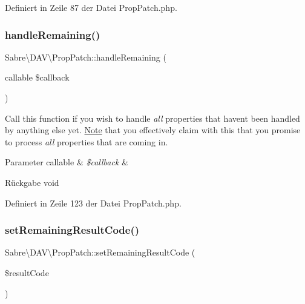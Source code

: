 Definiert in Zeile 87 der Datei Prop\+Patch.\+php.

\mbox{\label{class_sabre_1_1_d_a_v_1_1_prop_patch_a9908d93d975bc2cf4d85e8dbff42cd92}} 
\subsubsection{\texorpdfstring{handle\+Remaining()}{handleRemaining()}}
{\footnotesize\ttfamily Sabre\textbackslash{}\+D\+A\+V\textbackslash{}\+Prop\+Patch\+::handle\+Remaining (\begin{DoxyParamCaption}\item[{callable}]{\$callback }\end{DoxyParamCaption})}

Call this function if you wish to handle {\itshape all} properties that haven\textquotesingle{}t been handled by anything else yet. \mbox{\hyperlink{class_note}{Note}} that you effectively claim with this that you promise to process {\itshape all} properties that are coming in.


\begin{DoxyParams}[1]{Parameter}
callable & {\em \$callback} & \\
\hline
\end{DoxyParams}
\begin{DoxyReturn}{Rückgabe}
void 
\end{DoxyReturn}


Definiert in Zeile 123 der Datei Prop\+Patch.\+php.

\mbox{\label{class_sabre_1_1_d_a_v_1_1_prop_patch_ae1af4f2a5645b3c72bb2ab8359562452}} 
\subsubsection{\texorpdfstring{set\+Remaining\+Result\+Code()}{setRemainingResultCode()}}
{\footnotesize\ttfamily Sabre\textbackslash{}\+D\+A\+V\textbackslash{}\+Prop\+Patch\+::set\+Remaining\+Result\+Code (\begin{DoxyParamCaption}\item[{}]{\$result\+Code }\end{DoxyParamCaption})}

